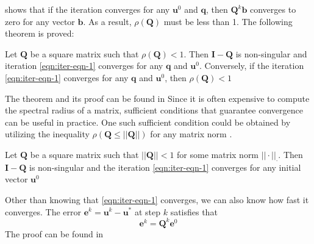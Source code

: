 shows that if the iteration converges for any $\boldsymbol{u}^0$ and $\boldsymbol{q}$, then $\boldsymbol{Q}^k\boldsymbol{b}$ converges to zero for any vector $\boldsymbol{b}$. As a result, $\rho(\boldsymbol{Q})$ must be less than 1. The following theorem is proved:
\begin{theorem}
Let $\boldsymbol{Q}$ be a square matrix such that $\rho(\boldsymbol{Q}) < 1$. Then $\boldsymbol{I} - \boldsymbol{Q}$ is non-singular and iteration \autoref{eqn:iter-eqn-1} converges for any $
\boldsymbol{q}$ and $\boldsymbol{u}^0$. Conversely, if the iteration \autoref{eqn:iter-eqn-1} converges for any $\boldsymbol{q}$ and $\boldsymbol{u}^0$, then $\rho(\boldsymbol{Q}) < 1$
\end{theorem}
The theorem and its proof can be found in \cite{doi:10.1137/1.9780898718003}
Since it is often expensive to compute the spectral radius of a matrix, sufficient conditions that guarantee convergence can be useful in practice. One such sufficient condition could be obtained by utilizing the inequality $\rho(\boldsymbol{Q} \leq ||\boldsymbol{Q}||)$ for any matrix norm \cite{doi:10.1137/1.9780898718003}.
\begin{corollary}
Let $\boldsymbol{Q}$ be a square matrix such that $||\boldsymbol{Q}|| < 1$  for some matrix norm $||\cdot||_\cdot$. Then $\boldsymbol{I} - \boldsymbol{Q}$ is non-singular and the iteration \autoref{eqn:iter-eqn-1} converges for any initial vector $\boldsymbol{u}^0$
\end{corollary}

Other than knowing that \autoref{eqn:iter-eqn-1} converges, we can also know how fast it converges. The error $\boldsymbol{e}^k = \boldsymbol{u}^k - \boldsymbol{u}^*$ at step $k$ satisfies that 
\begin{equation}
    \boldsymbol{e}^k = \boldsymbol{Q}^k \boldsymbol{e}^0
\end{equation}
The proof can be found in \cite{doi:10.1137/1.9780898718003}

